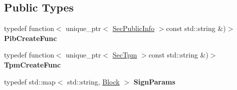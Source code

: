 \subsection*{Public Types}
\begin{DoxyCompactItemize}
\item 
typedef function$<$ unique\+\_\+ptr$<$ \hyperlink{classndn_1_1SecPublicInfo}{Sec\+Public\+Info} $>$const std\+::string \&)$>$ {\bfseries Pib\+Create\+Func}\hypertarget{classndn_1_1security_1_1KeyChain_a61c4bc7504dea92ff86d8d764d2e6032}{}\label{classndn_1_1security_1_1KeyChain_a61c4bc7504dea92ff86d8d764d2e6032}

\item 
typedef function$<$ unique\+\_\+ptr$<$ \hyperlink{classndn_1_1SecTpm}{Sec\+Tpm} $>$const std\+::string \&)$>$ {\bfseries Tpm\+Create\+Func}\hypertarget{classndn_1_1security_1_1KeyChain_a16e87c0b3e8263365c37c7f1d0baeb19}{}\label{classndn_1_1security_1_1KeyChain_a16e87c0b3e8263365c37c7f1d0baeb19}

\item 
typedef std\+::map$<$ std\+::string, \hyperlink{classndn_1_1Block}{Block} $>$ {\bfseries Sign\+Params}\hypertarget{classndn_1_1security_1_1KeyChain_a1bb8349eaa4e87d4d3fa2855bf19c0e3}{}\label{classndn_1_1security_1_1KeyChain_a1bb8349eaa4e87d4d3fa2855bf19c0e3}

\end{DoxyCompactItemize}
